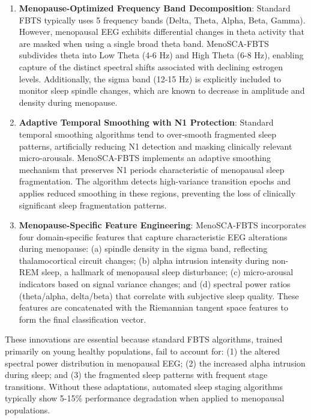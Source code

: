 \documentclass[ASNA,twocolumn]{USG}
\begin{document}
\begin{enumerate}
\item \textbf{Menopause-Optimized Frequency Band Decomposition}: Standard FBTS typically uses 5 frequency bands (Delta, Theta, Alpha, Beta, Gamma). However, menopausal EEG exhibits differential changes in theta activity that are masked when using a single broad theta band. MenoSCA-FBTS subdivides theta into Low Theta (4-6 Hz) and High Theta (6-8 Hz), enabling capture of the distinct spectral shifts associated with declining estrogen levels. Additionally, the sigma band (12-15 Hz) is explicitly included to monitor sleep spindle changes, which are known to decrease in amplitude and density during menopause.

\item \textbf{Adaptive Temporal Smoothing with N1 Protection}: Standard temporal smoothing algorithms tend to over-smooth fragmented sleep patterns, artificially reducing N1 detection and masking clinically relevant micro-arousals. MenoSCA-FBTS implements an adaptive smoothing mechanism that preserves N1 periods characteristic of menopausal sleep fragmentation. The algorithm detects high-variance transition epochs and applies reduced smoothing in these regions, preventing the loss of clinically significant sleep fragmentation patterns.

\item \textbf{Menopause-Specific Feature Engineering}: MenoSCA-FBTS incorporates four domain-specific features that capture characteristic EEG alterations during menopause: (a) spindle density in the sigma band, reflecting thalamocortical circuit changes; (b) alpha intrusion intensity during non-REM sleep, a hallmark of menopausal sleep disturbance; (c) micro-arousal indicators based on signal variance changes; and (d) spectral power ratios (theta/alpha, delta/beta) that correlate with subjective sleep quality. These features are concatenated with the Riemannian tangent space features to form the final classification vector.
\end{enumerate}

These innovations are essential because standard FBTS algorithms, trained primarily on young healthy populations, fail to account for: (1) the altered spectral power distribution in menopausal EEG; (2) the increased alpha intrusion during sleep; and (3) the fragmented sleep patterns with frequent stage transitions. Without these adaptations, automated sleep staging algorithms typically show 5-15\% performance degradation when applied to menopausal populations.
\end{document}
